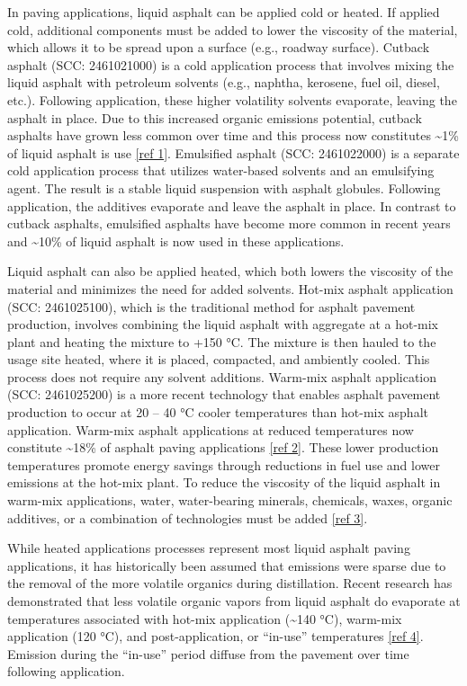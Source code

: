 \documentclass[
  11pt,
  oneside]{book}
\begin{document}
In paving applications, liquid asphalt can be applied cold or heated. If applied cold, additional components must be added to lower the viscosity of the material, which allows it to be spread upon a surface (e.g., roadway surface). Cutback asphalt (SCC: 2461021000) is a cold application process that involves mixing the liquid asphalt with petroleum solvents (e.g., naphtha, kerosene, fuel oil, diesel, etc.). Following application, these higher volatility solvents evaporate, leaving the asphalt in place. Due to this increased organic emissions potential, cutback asphalts have grown less common over time and this process now constitutes \textasciitilde1\% of liquid asphalt is use \hyperref[asphalt-references]{{[}ref 1{]}}. Emulsified asphalt (SCC: 2461022000) is a separate cold application process that utilizes water-based solvents and an emulsifying agent. The result is a stable liquid suspension with asphalt globules. Following application, the additives evaporate and leave the asphalt in place. In contrast to cutback asphalts, emulsified asphalts have become more common in recent years and \textasciitilde10\% of liquid asphalt is now used in these applications.

Liquid asphalt can also be applied heated, which both lowers the viscosity of the material and minimizes the need for added solvents. Hot-mix asphalt application (SCC: 2461025100), which is the traditional method for asphalt pavement production, involves combining the liquid asphalt with aggregate at a hot-mix plant and heating the mixture to +150 °C. The mixture is then hauled to the usage site heated, where it is placed, compacted, and ambiently cooled. This process does not require any solvent additions. Warm-mix asphalt application (SCC: 2461025200) is a more recent technology that enables asphalt pavement production to occur at 20 -- 40 °C cooler temperatures than hot-mix asphalt application. Warm-mix asphalt applications at reduced temperatures now constitute \textasciitilde18\% of asphalt paving applications \hyperref[asphalt-references]{{[}ref 2{]}}. These lower production temperatures promote energy savings through reductions in fuel use and lower emissions at the hot-mix plant. To reduce the viscosity of the liquid asphalt in warm-mix applications, water, water-bearing minerals, chemicals, waxes, organic additives, or a combination of technologies must be added \hyperref[asphalt-references]{{[}ref 3{]}}.

While heated applications processes represent most liquid asphalt paving applications, it has historically been assumed that emissions were sparse due to the removal of the more volatile organics during distillation. Recent research has demonstrated that less volatile organic vapors from liquid asphalt do evaporate at temperatures associated with hot-mix application (\textasciitilde140 °C), warm-mix application (120 °C), and post-application, or ``in-use'' temperatures \hyperref[asphalt-references]{{[}ref 4{]}}. Emission during the ``in-use'' period diffuse from the pavement over time following application.
\end{document}

